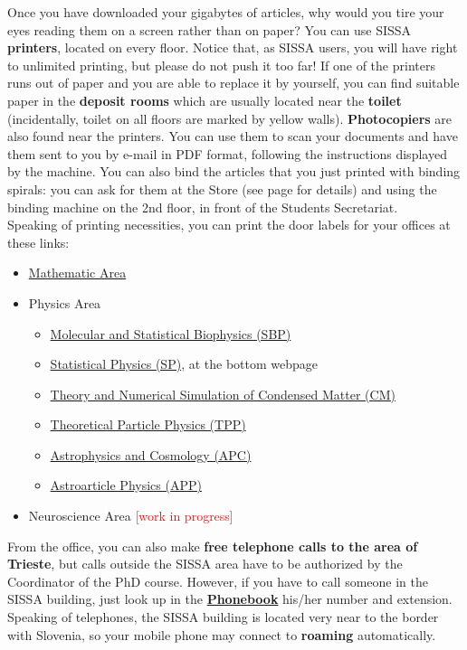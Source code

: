 \documentclass{sissavademecum}
\begin{document}
Once you have downloaded your gigabytes of articles, why would you tire your eyes reading them on a screen rather than on paper? You can use SISSA \textbf{printers}, located on every floor. Notice that, as SISSA users, you will have right to unlimited printing, but please do not push it too far! If one of the printers runs out of paper and you are able to replace it by yourself, you can find suitable paper in the \textbf{deposit rooms} which are usually located near the \textbf{toilet} (incidentally, toilet on all floors are marked by yellow walls). \textbf{Photocopiers} are also found near the printers. You can use them to scan your documents and have them sent to you by e-mail in PDF format, following the instructions displayed by the machine. You can also bind the articles that you just printed with binding spirals: you can ask for them at the Store (see page \pageref{sec:Store} for details) and using the binding machine on the 2nd floor, in front of the Students Secretariat. \\
Speaking of printing necessities, you can print the door labels for your offices at these links:
\begin{itemize}
	\item \href{https://www.math.sissa.it/content/door-label}{Mathematic Area}
	\item Physics Area
		\begin{itemize}
			\item \href{https://www.sissa.it/sbp/webtools/doorlabel/door.php}{Molecular and Statistical Biophysics  (SBP)}
			\item \href{https://www.statphys.sissa.it/wordpress/?page_id=1684}{Statistical Physics (SP)}, at the bottom webpage
			\item \href{https://drive.google.com/open?id=1cXeavsXzdJGx8aPpN6UYXrCZ6yoPBbuA}{Theory and Numerical Simulation of Condensed Matter (CM)}
			\item \href{https://www.sissa.it/tpp/webtools/doorlabel/door.php}{Theoretical Particle Physics (TPP)}
			\item \href{https://www.sissa.it/ap/webtools/doorlabel/door.php}{Astrophysics and Cosmology (APC)}
			\item \href{https://www.sissa.it/app/webtools/doorlabel/door.php}{Astroarticle Physics (APP)}
		\end{itemize}
	\item Neuroscience Area \textcolor{red}{[work in progress]}
\end{itemize} 

From the office, you can also make \textbf{free telephone calls to the area of Trieste}, but calls outside the SISSA area have to be authorized by the Coordinator of the PhD course. However, if you have to call someone in the SISSA building, just look up in the \href{http://services.sissa.it/phonebook/index.php?r=site/people}{\textbf{Phonebook}} his/her number and extension. Speaking of telephones, the SISSA building is located very near to the border with Slovenia, so your mobile phone may connect to \textbf{roaming}
automatically.
\end{document}
